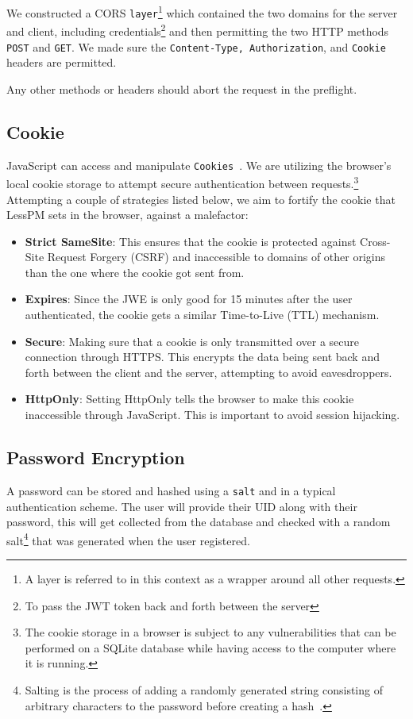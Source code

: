 We constructed a CORS \texttt{layer}\footnote{
  A layer is referred to in this context as a wrapper around all other requests.
} which contained the two domains for the server and client, including
credentials\footnote{
  To pass the JWT token back and forth between the server
} and then permitting the two HTTP methods \texttt{POST} and \texttt{GET}.
We made sure the \texttt{Content-Type, Authorization}, and \texttt{Cookie}
headers are permitted.

Any other methods or headers should abort the request in the preflight.

\subsection{Cookie}\label{subsec:cookie}
JavaScript can access and manipulate \texttt{Cookies}~\cite{he2019malicious}.
We are utilizing the browser's local cookie storage to attempt secure
authentication between requests.\footnote{
  The cookie storage in a browser is subject to any vulnerabilities that can
  be performed on a SQLite database while having access to the computer where
  it is running.
}
Attempting a couple of strategies listed below, we aim to fortify the cookie
that LessPM sets in the browser, against a malefactor:
\begin{itemize}
  \item \textbf{Strict SameSite}:
  This ensures that the cookie is protected against Cross-Site Request
  Forgery (CSRF) and inaccessible to domains of other origins than the one
  where the cookie got sent from.
  \item \textbf{Expires}:
  Since the JWE is only good for 15 minutes after the user authenticated, the
  cookie gets a similar Time-to-Live (TTL) mechanism.
  \item \textbf{Secure}:
  Making sure that a cookie is only transmitted over a secure connection
  through HTTPS\@.
  This encrypts the data being sent back and forth between the client and
  the server, attempting to avoid eavesdroppers.
  \item \textbf{HttpOnly}:
  Setting HttpOnly tells the browser to make this cookie inaccessible through
  JavaScript.
  This is important to avoid session hijacking.
\end{itemize}

\subsection{Password Encryption}\label{subsec:password-encryption}
A password can be stored and hashed using a \texttt{salt} and in a typical
authentication scheme.
The user will provide their UID along with their password, this will get
collected from the database and checked with a random salt\footnote{
  Salting is the process of adding a randomly generated string consisting of
  arbitrary characters to the password before creating a hash~\cite{
    Kharod2015}.
} that was generated when the user registered.

